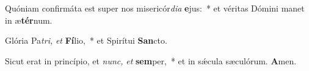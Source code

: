 \item Quóniam confirmáta est super nos misericór\textit{di}\textit{a} \textbf{e}jus:~* et véritas Dómini manet in æ\textbf{tér}num.
\item Glória Pa\hspace*{0.03em}\textit{tri,} \textit{et} \textbf{Fí}lio,~* et Spirítui \textbf{San}cto.
\item Sicut erat in princípio, et \textit{nunc,} \textit{et} \textbf{sem}per,~* et in sǽcula sæculórum. \textbf{A}men.

